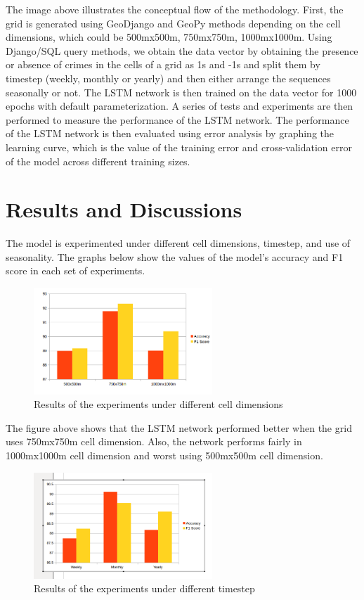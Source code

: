 \documentclass[a0]{sciposter}
\begin{document}
\begin{multicols}{2}
    The image above illustrates the conceptual flow of the methodology. First, the grid is generated using GeoDjango and GeoPy methods depending on the cell dimensions, which could be 500mx500m, 750mx750m, 1000mx1000m. Using Django/SQL query methods, we obtain the data vector by obtaining the presence or absence of crimes in the cells of a grid as 1s and -1s and split them by timestep (weekly, monthly or yearly) and then either arrange the sequences seasonally or not. The LSTM network is then trained on the data vector for 1000 epochs with default parameterization. A series of tests and experiments are then performed to measure the performance of the LSTM network. The performance of the LSTM network is then evaluated using error analysis by graphing the learning curve, which is the value of the training error and cross-validation error of the model across different training sizes.
    \section{Results and Discussions}
    The model is experimented under different cell dimensions, timestep, and use of seasonality. The graphs below show the values of the model's accuracy and F1 score in each set of experiments.

    \begin{figure}[ht]
    \centering
    \includegraphics[width=0.6\textwidth]{dimensions-experiments}
    \caption{Results of  the experiments under different cell dimensions}
    \end{figure}

    The figure above shows that the LSTM network performed better when the grid uses 750mx750m cell dimension. Also, the network performs fairly in 1000mx1000m cell dimension and worst using 500mx500m cell dimension.

    \begin{figure}[ht]
    \centering
    \includegraphics[width=0.6\textwidth]{timestep-experiment}
    \caption{Results of  the experiments under different timestep}
    \end{figure}


\end{multicols}
\end{document}
